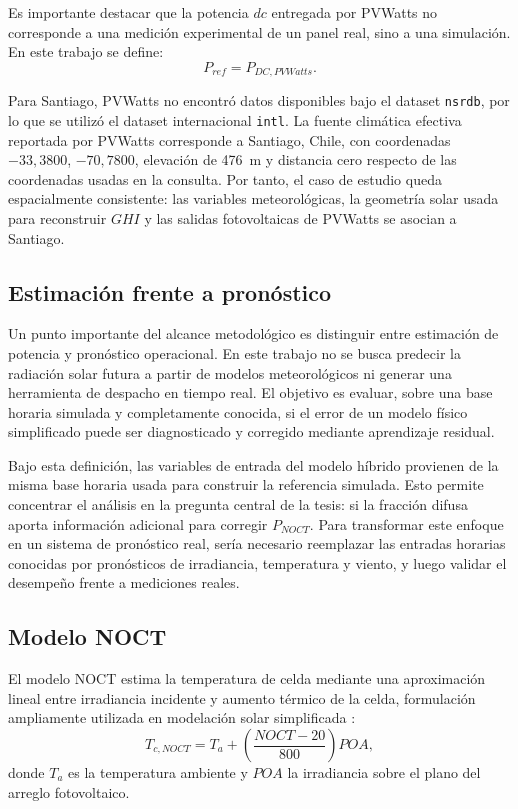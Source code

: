 \documentclass[12pt, letterpaper]{article}
\begin{document}
Es importante destacar que la potencia \(dc\) entregada por PVWatts no corresponde a una medici\'on experimental de un panel real, sino a una simulaci\'on. En este trabajo se define:
\[
    P_{ref} = P_{DC,PVWatts}.
\]

Para Santiago, PVWatts no encontr\'o datos disponibles bajo el dataset \texttt{nsrdb}, por lo que se utiliz\'o el dataset internacional \texttt{intl}. La fuente clim\'atica efectiva reportada por PVWatts corresponde a Santiago, Chile, con coordenadas \(-33{,}3800\), \(-70{,}7800\), elevaci\'on de \SI{476}{\meter} y distancia cero respecto de las coordenadas usadas en la consulta. Por tanto, el caso de estudio queda espacialmente consistente: las variables meteorol\'ogicas, la geometr\'ia solar usada para reconstruir \(GHI\) y las salidas fotovoltaicas de PVWatts se asocian a Santiago.

\subsection{Estimaci\'on frente a pron\'ostico}

Un punto importante del alcance metodol\'ogico es distinguir entre estimaci\'on de potencia y pron\'ostico operacional. En este trabajo no se busca predecir la radiaci\'on solar futura a partir de modelos meteorol\'ogicos ni generar una herramienta de despacho en tiempo real. El objetivo es evaluar, sobre una base horaria simulada y completamente conocida, si el error de un modelo f\'isico simplificado puede ser diagnosticado y corregido mediante aprendizaje residual.

Bajo esta definici\'on, las variables de entrada del modelo h\'ibrido provienen de la misma base horaria usada para construir la referencia simulada. Esto permite concentrar el an\'alisis en la pregunta central de la tesis: si la fracci\'on difusa aporta informaci\'on adicional para corregir \(P_{NOCT}\). Para transformar este enfoque en un sistema de pron\'ostico real, ser\'ia necesario reemplazar las entradas horarias conocidas por pron\'osticos de irradiancia, temperatura y viento, y luego validar el desempe\~no frente a mediciones reales.

\subsection{Modelo NOCT}

El modelo NOCT estima la temperatura de celda mediante una aproximaci\'on lineal entre irradiancia incidente y aumento t\'ermico de la celda, formulaci\'on ampliamente utilizada en modelaci\'on solar simplificada :
\[
    T_{c,NOCT} = T_a + \left(\frac{NOCT - 20}{800}\right) POA,
\]
donde \(T_a\) es la temperatura ambiente y \(POA\) la irradiancia sobre el plano del arreglo fotovoltaico.
\end{document}
